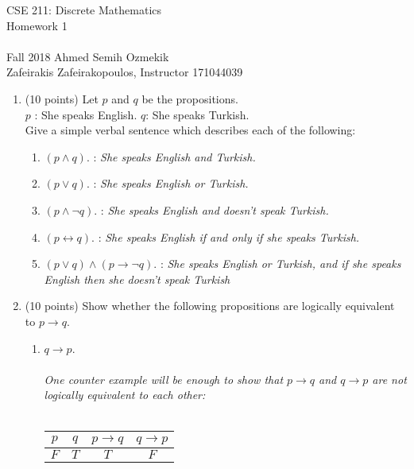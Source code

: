 \documentclass[12pt,fleqn]{article}
\begin{document}

\setcounter{page}{1}
\thispagestyle{empty}

\begin{center}
\LARGE
CSE 211: Discrete Mathematics \\
Homework 1 \\
\normalsize 
\ \\
Fall 2018 \hfill Ahmed Semih Ozmekik \\
Zafeirakis  Zafeirakopoulos, Instructor \hfill 171044039

\end{center}

\normalsize

\begin{enumerate}

\item (10 points) Let  $p$ and $q$ be the propositions. \\
$p$ : She speaks English. \space $q$: She speaks Turkish. \\
Give a simple verbal sentence which describes each of the following:
\begin{enumerate}
\item \space $(p \wedge q)$. : \textit{She speaks English and Turkish.}
\item \space $(p \vee q)$. : \textit{She speaks English or Turkish.}
\item \space $(p \wedge \neg q)$. : \textit{She speaks English and doesn't speak Turkish.}
\item \space $(p \leftrightarrow q)$. : \textit{She speaks English if and only if she speaks Turkish.}
\item \space $(p \vee q)\wedge (p \rightarrow \neg q)$. : \textit{She speaks English or Turkish, and if she speaks English then she doesn't speak Turkish}
\end{enumerate} 

\item (10 points) Show whether the following propositions are logically equivalent to $p \rightarrow q$. 
\begin{enumerate}
\item \space $q \rightarrow p$. \\\\ \textit{One counter example will be enough to show that $p \rightarrow q$ and $q \rightarrow p$ are not logically equivalent to each other: }
\\\\\begin{tabular}{ c | c | c | c }
  $p$ & $q$ & $p \rightarrow q$ & $q \rightarrow p$ \\ \hline
  $F$ & $T$ & $T$ & $F$ 
\end{tabular}\\



\end{enumerate}
\end{enumerate}
\end{document}
